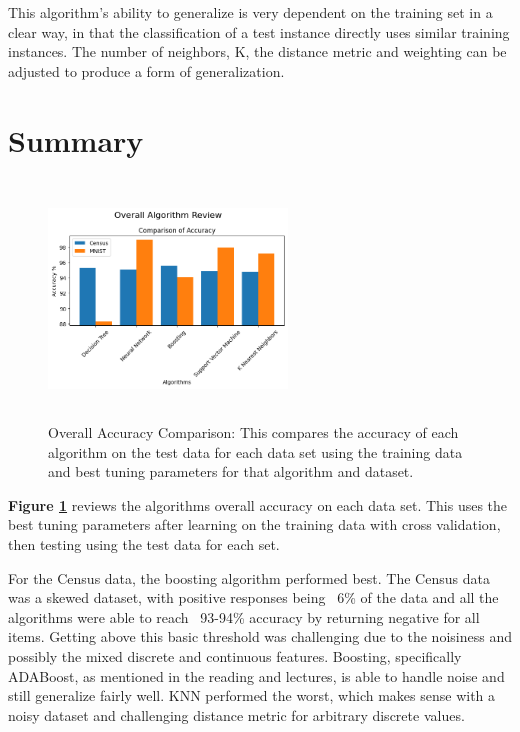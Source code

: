 \documentclass[letterpaper]{article} %
\begin{document}
This algorithm's ability to generalize is very dependent on the training set in a clear way, in that the classification of a test instance directly uses similar training instances.  The number of neighbors, K, the distance metric and weighting can be adjusted to produce a form of generalization.

\section{Summary}

\begin{figure}[h]
\centering
\includegraphics[width=2.5in, height=2.5in]{figures/Overall_Algorithm_ReviewComparison_of_Accuracy_.png}
\caption{Overall Accuracy Comparison:  This compares the accuracy of each algorithm on the test data for each data set using the training data and best tuning parameters for that algorithm and dataset.  }
\label{fig:overall_accuracy}
\end{figure}

\textbf{Figure \ref{fig:overall_accuracy}} reviews the algorithms overall accuracy on each data set.  This uses the best tuning parameters after learning on the training data with cross validation, then testing using the test data for each set.  
 
For the Census data, the boosting algorithm performed best.  The Census data was a skewed dataset, with positive responses being ~6\% of the data and all the algorithms were able to reach ~93-94\% accuracy by returning negative for all items.  Getting above this basic threshold was challenging due to the noisiness and possibly the mixed discrete and continuous features.  Boosting, specifically ADABoost, as mentioned in the reading and lectures, is able to handle noise and still generalize fairly well.  KNN performed the worst, which makes sense with a noisy dataset and challenging distance metric for arbitrary discrete values.   
\end{document}
